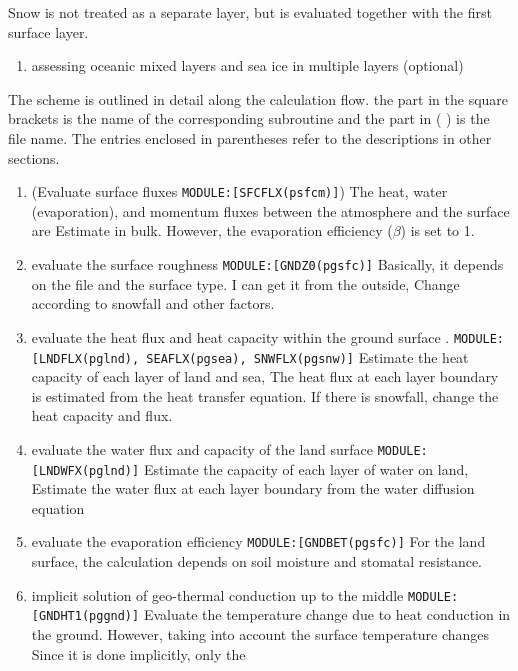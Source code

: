 Snow is not treated as a separate layer, but is evaluated together with
the first surface layer.

\begin{enumerate}
\def\labelenumi{\arabic{enumi}.}
\setcounter{enumi}{4}
\tightlist
\item
  assessing oceanic mixed layers and sea ice in multiple layers
  (optional)
\end{enumerate}

The scheme is outlined in detail along the calculation flow. \where the
part in the square brackets is the name of the corresponding subroutine
and the part in ( ) is the file name. The entries enclosed in
parentheses refer to the descriptions in other sections.

\begin{enumerate}
\def\labelenumi{\arabic{enumi}.}
\item
  (Evaluate surface fluxes \texttt{MODULE:{[}SFCFLX(psfcm){]}}) The
  heat, water (evaporation), and momentum fluxes between the atmosphere
  and the surface are Estimate in bulk. However, the evaporation
  efficiency (\(\beta\)) is set to 1.
\item
  evaluate the surface roughness \texttt{MODULE:{[}GNDZ0(pgsfc){]}}
  Basically, it depends on the file and the surface type. I can get it
  from the outside, Change according to snowfall and other factors.
\item
  evaluate the heat flux and heat capacity within the ground surface .
  \texttt{MODULE:{[}LNDFLX(pglnd),\ SEAFLX(pgsea),\ SNWFLX(pgsnw){]}}
  Estimate the heat capacity of each layer of land and sea, The heat
  flux at each layer boundary is estimated from the heat transfer
  equation. If there is snowfall, change the heat capacity and flux.
\item
  evaluate the water flux and capacity of the land surface
  \texttt{MODULE:{[}LNDWFX(pglnd){]}} Estimate the capacity of each
  layer of water on land, Estimate the water flux at each layer boundary
  from the water diffusion equation
\item
  evaluate the evaporation efficiency
  \texttt{MODULE:{[}GNDBET(pgsfc){]}} For the land surface, the
  calculation depends on soil moisture and stomatal resistance.
\item
  implicit solution of geo-thermal conduction up to the middle
  \texttt{MODULE:{[}GNDHT1(pggnd){]}} Evaluate the temperature change
  due to heat conduction in the ground. However, taking into account the
  surface temperature changes Since it is done implicitly, only the

\end{enumerate}
